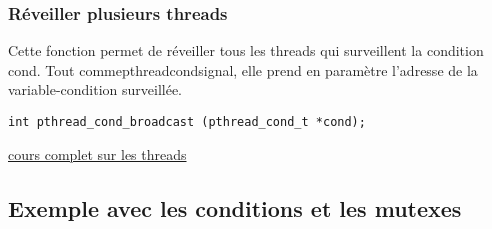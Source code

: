 \documentclass[a4paper]{article}
\begin{document}
\subsubsection{Réveiller plusieurs threads}
Cette fonction permet de réveiller tous les threads qui surveillent la condition cond. Tout comme\newline pthread\textunderscore{}cond\textunderscore{}signal, elle prend en paramètre l'adresse de la variable-condition surveillée. 
\begin{lstlisting}
int pthread_cond_broadcast (pthread_cond_t *cond);
\end{lstlisting}
\href{http://franckh.developpez.com/tutoriels/posix/pthreads/}{cours complet sur les threads}
\newpage
\subsection{Exemple avec les conditions et les mutexes}
\end{document}
